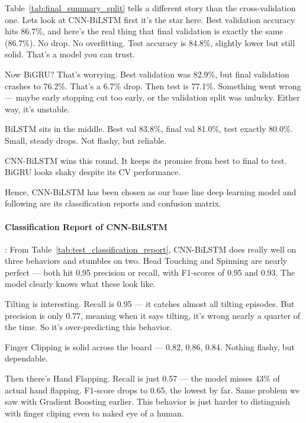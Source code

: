Table~\ref{tab:final_summary_split} tells a different story than the cross-validation one. Lets look at CNN-BiLSTM first  it's the star here. Best validation accuracy hits 86.7\%, and here's the real thing that final validation is exactly the same (86.7\%). No drop. No overfitting. Test accuracy is 84.8\%, slightly lower but still solid. That's a model you can trust.

Now BiGRU? That's worrying. Best validation was 82.9\%, but final validation crashes to 76.2\%. That's a 6.7\% drop. Then test is 77.1\%. Something went wrong — maybe early stopping cut too early, or the validation split was unlucky. Either way, it's unstable.

BiLSTM sits in the middle. Best val 83.8\%, final val 81.0\%, test exactly 80.0\%. Small, steady drops. Not flashy, but reliable.

CNN-BiLSTM wins this round. It keeps its promise from best to final to test. BiGRU looks shaky despite its CV performance.


Hence, CNN-BiLSTM has been chosen as our base line deep learning model and following are its classification reports and confusion matrix.

\paragraph{Classification Report of CNN-BiLSTM} : 
From Table~\ref{tab:test_classification_report}, CNN-BiLSTM does really well on three behaviors and stumbles on two. Head Touching and Spinning are nearly perfect — both hit 0.95 precision or recall, with F1-scores of 0.95 and 0.93. The model clearly knows what these look like.

Tilting is interesting. Recall is 0.95 — it catches almost all tilting episodes. But precision is only 0.77, meaning when it says tilting, it's wrong nearly a quarter of the time. So it's over-predicting this behavior.

Finger Clipping is solid across the board — 0.82, 0.86, 0.84. Nothing flashy, but dependable.

Then there's Hand Flapping. Recall is just 0.57 — the model misses 43\% of actual hand flapping. F1-score drops to 0.65, the lowest by far. Same problem we saw with Gradient Boosting earlier. This behavior is just harder to distinguish with finger cliping even to naked eye of a human.

